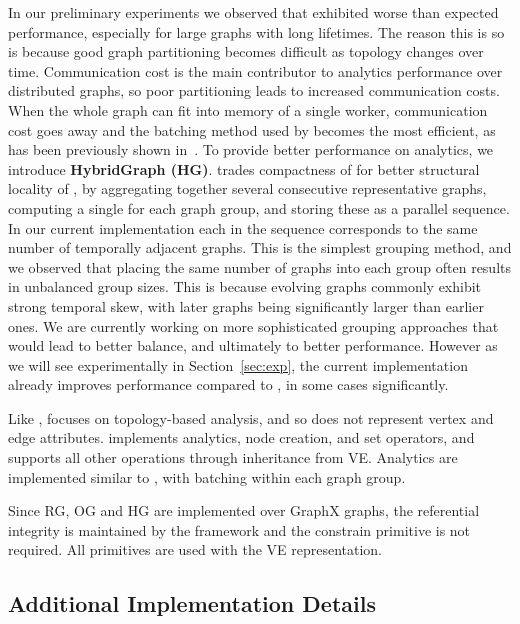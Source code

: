 In our preliminary experiments we observed that \og exhibited worse
than expected performance, especially for large graphs with long
lifetimes.  The reason this is so is because good graph partitioning
becomes difficult as topology changes over time.  Communication cost
is the main contributor to analytics performance over distributed
graphs, so poor partitioning leads to increased communication costs.
When the whole graph can fit into memory of a single worker,
communication cost goes away and the batching method used by \og
becomes the most efficient, as has been previously shown
in~\cite{Miao2015}.  To provide better performance on analytics, we
introduce {\bf HybridGraph (HG)}.  \hg trades compactness of \og for
better structural locality of \rg, by aggregating together several
consecutive representative graphs, computing a single \og for each
graph group, and storing these as a parallel sequence.  In our current
implementation each \og in the sequence corresponds to the same number
of temporally adjacent graphs.
%
This is the simplest grouping method, and we observed that placing the
same number of graphs into each group often results in unbalanced
group sizes.  This is because evolving graphs commonly exhibit strong
temporal skew, with later graphs being significantly larger than earlier
ones.  We are currently working on more sophisticated grouping
approaches that would lead to better balance, and ultimately to better
performance.  However as we will see experimentally in
Section~\ref{sec:exp}, the current \hg implementation already improves
performance compared to \og, in some cases significantly.

Like \og, \hg focuses on topology-based analysis, and so does not
represent vertex and edge attributes. \hg implements analytics, node
creation, and set operators, and supports all other operations through
inheritance from VE.  Analytics are implemented similar to \og, with
batching within each graph group.

Since RG, OG and HG are implemented over GraphX graphs, the
referential integrity is maintained by the framework and the constrain
primitive is not required.  All primitives are used with the VE
representation.

\subsection{Additional Implementation Details}
\label{sec:sys:maint}


